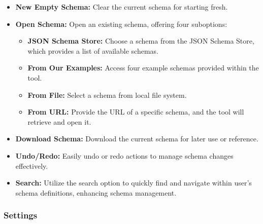 \begin{itemize}
    \item \textbf{New Empty Schema:} Clear the current schema for starting fresh.
\end{itemize}

\begin{itemize}
    \item \textbf{Open Schema:} Open an existing schema, offering four suboptions:
    \begin{itemize}
        \item \textbf{JSON Schema Store:} Choose a schema from the JSON Schema Store, which provides a list of available schemas.

        \item \textbf{From Our Examples:} Access four example schemas provided within the tool.

        \item \textbf{From File:} Select a schema from local file system.

        \item \textbf{From URL:} Provide the URL of a specific schema, and the tool will retrieve and open it.

    \end{itemize}
\end{itemize}

\begin{itemize}
    \item \textbf{Download Schema:} Download the current schema for later use or reference.
\end{itemize}
\begin{itemize}
    \item \textbf{Undo/Redo:} Easily undo or redo actions to manage schema changes effectively.

\end{itemize}
\begin{itemize}
    \item \textbf{Search:} Utilize the search option to quickly find and navigate within user's schema definitions, enhancing schema management.
\end{itemize}

\subsubsection{Settings}

